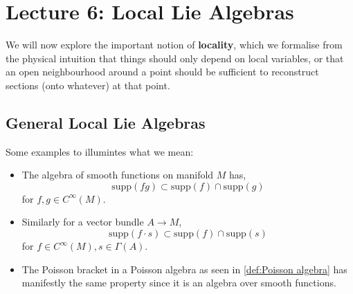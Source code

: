 % 
\newpage
{}
\section{Lecture 6: Local Lie Algebras} %
\label{sec:lecture_6_local_lie_algebras}
% 
We will now explore the important notion of \textbf{locality}, which we formalise from the physical intuition that things should only depend on local variables, or that an open neighbourhood around a point should be sufficient to reconstruct sections (onto whatever) at that point.
% 
\subsection{General Local Lie Algebras} %
\label{sub:general_local_lie_algebras}
% 
\label{def:support}
\label{def:locality}
% 
Some examples to illumintes what we mean:
\begin{itemize}
    \item The algebra of smooth functions on manifold $M$ has,
    \begin{equation*}
        \mathrm{supp}(fg) \subset \mathrm{supp}(f) \cap \mathrm{supp}(g)
    \end{equation*}
    for $f,g \in C^\infty(M)$.
    \item Similarly for a vector bundle $A \rightarrow M$,
    \begin{equation*}
        \mathrm{supp}(f \cdot s  ) \subset \mathrm{supp}(f) \cap \mathrm{supp}(s)
    \end{equation*}
    for $f \in C^\infty(M), s \in \Gamma(A)$.
    \item The Poisson bracket in a Poisson algebra as seen in \cref{def:Poisson algebra} has manifestly the same property since it is an algebra over smooth functions.
\end{itemize}
% 
\label{def:local lie algebra-historical}
